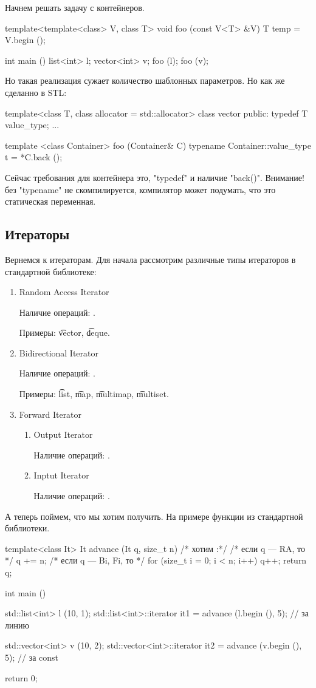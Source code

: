 Начнем решать задачу с контейнеров. 
\begin{cppcode}
template<template<class> V, class T>
void foo (const V<T> &V) {
    T temp = V.begin ();
}

int main () {
    list<int> l; 
    vector<int> v;
    foo (l);
    foo (v); 
}
\end{cppcode}

Но такая реализация сужает количество шаблонных параметров. 
Но как же сделанно в STL: 
\begin{cppcode}
template<class T, class allocator = std::allocator>
class vector {
public:
    typedef T value_type; 
...
}


template <class Container>
foo (Container& C) {
    typename Container::value_type
        t = *C.back ();
}
\end{cppcode}

Сейчас требования для контейнера это, \cpp"typedef" и наличие \cpp"back()". 
Внимание! без \cpp"typename" не скомпилируется, компилятор может подумать, что это статическая переменная.


\subsection{Итераторы}
Вернемся к итераторам.
Для начала рассмотрим различные типы итераторов в стандартной библиотеке:
\begin{enumerate}
\item 
    Random Access Iterator 

    Наличие операций: \cpp{*->, ++, --, -, +=, -=}.

    Примеры: \t{vector}, \t{deque}.
\item
    Bidirectional Iterator

    Наличие операций: \cpp{*->, ++, --}.

    Примеры: \t{list}, \t{map}, \t{multimap}, \t{multiset}.
\item
    Forward Iterator 
    \begin{enumerate}
    \item
        Output Iterator

        Наличие операций: .
    \item
        Inptut Iterator

        Наличие операций: .
    \end{enumerate}
\end{enumerate}

А теперь поймем, что мы хотим получить.
На примере функции  из стандартной библиотеки.
\begin{cppcode}
template<class It>
It advance (It q, size_t n) {
    /* хотим :*/
    /* если q --- RA, то */
        q += n;
    /* если q --- Bi, Fi, то */
        for (size_t i = 0; i < n; i++)
            q++;
    return q;
}

int main () {
    std::list<int> l (10, 1); 
    std::list<int>::iterator    it1 = advance (l.begin (), 5); // за линию 

    std::vector<int> v (10, 2);
    std::vector<int>::iterator  it2 = advance (v.begin (), 5); // за const

    return 0;
}
\end{cppcode}

